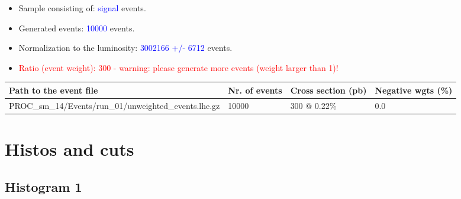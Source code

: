 \documentclass[a4paper, 10pt]{article}
\begin{document}
\begin{itemize}
  \item Sample consisting of: \textcolor{blue}{signal}  events.
   \item Generated events: \textcolor{blue}{10000 }  events.
   \item Normalization to the luminosity: \textcolor{blue}{3002166}\textcolor{blue}{ +/\-- }\textcolor{blue}{6712 }  events.
   \item\textcolor{red}{Ratio (event weight): }\textcolor{red}{300 }\textcolor{red}{ - warning: please generate more events (weight larger than 1)!}
\textcolor{red}{}
\end{itemize}
\begin{table}[H]
  \begin{center}
    \begin{tabular}{|m{55.0mm}|m{25.0mm}|m{30.0mm}|m{30.0mm}|}
      \hline
      {\cellcolor{yellow}         Path to the event file}& {\cellcolor{yellow}         Nr. of events}& {\cellcolor{yellow}         Cross section (pb)}& {\cellcolor{yellow}         Negative wgts (\%)}\\
      \hline
      {\cellcolor{white}          PROC\_sm\_14/\-Events/\-run\_01/\-unweighted\_events.lhe.gz}& {\cellcolor{white}          10000}& {\cellcolor{white}          300 @ 0.22\%}& {\cellcolor{white}          0.0}\\
\hline
    \end{tabular}
  \end{center}
\end{table}

\newpage
\section{ Histos and cuts}

\subsection{ Histogram 1}
\end{document}
